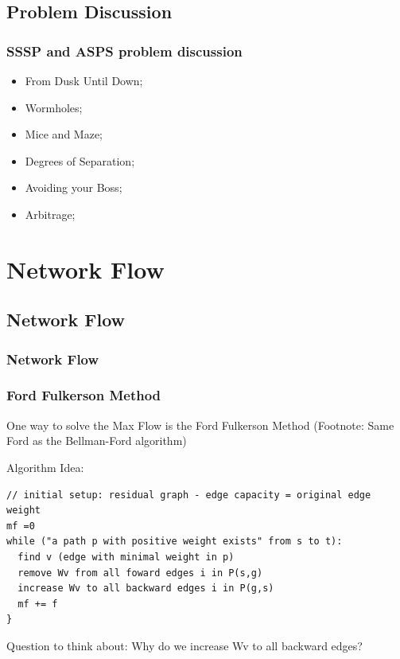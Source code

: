 \documentclass{beamer}
\begin{document}
\subsection{Problem Discussion}
\begin{frame}
  \frametitle{SSSP and ASPS problem discussion}
  {\smaller
  \begin{itemize}
    \item From Dusk Until Down;
    \item Wormholes; 
    \item Mice and Maze; 
    \item Degrees of Separation;
    \item Avoiding your Boss;
    \item Arbitrage;
  \end{itemize}}
\end{frame}

\section{Network Flow}
\subsection{Network Flow}
\begin{frame}
  \frametitle{Network Flow}



\end{frame}

\begin{frame}
  \frametitle{Ford Fulkerson Method}
  One way to solve the Max Flow is the Ford Fulkerson Method (Footnote: Same Ford as the Bellman-Ford algorithm)

Algorithm Idea:
\begin{verbatim}
// initial setup: residual graph - edge capacity = original edge weight
mf =0
while ("a path p with positive weight exists" from s to t):
  find v (edge with minimal weight in p)
  remove Wv from all foward edges i in P(s,g)
  increase Wv to all backward edges i in P(g,s)
  mf += f
} 
\end{verbatim}

Question to think about: Why do we increase Wv to all backward edges?
\end{frame}
\end{document}
